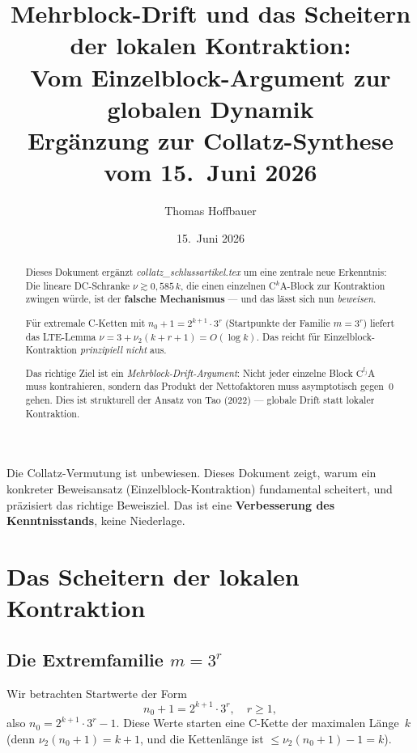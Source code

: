 \documentclass[12pt,a4paper]{article}
\title{%
  Mehrblock-Drift und das Scheitern der lokalen Kontraktion:\\[0.3em]
  Vom Einzelblock-Argument zur globalen Dynamik\\[0.5em]
  \large Ergänzung zur Collatz-Synthese vom 15.\ Juni 2026%
}
\author{Thomas Hoffbauer}
\date{15.\ Juni 2026}
\newcommand{\vii}{\nu_2}
\begin{document}
\maketitle

\begin{abstract}
Dieses Dokument ergänzt \textit{collatz\_schlussartikel.tex} um eine zentrale
neue Erkenntnis: Die lineare DC-Schranke $\nu \gtrsim 0{,}585\,k$, die einen
einzelnen C$^k$A-Block zur Kontraktion zwingen würde, ist der
\textbf{falsche Mechanismus} --- und das lässt sich nun \emph{beweisen}.

Für extremale C-Ketten mit $n_0+1 = 2^{k+1}\cdot 3^r$ (Startpunkte der
Familie $m = 3^r$) liefert das LTE-Lemma $\nu = 3 + \vii(k+r+1) = O(\log k)$.
Das reicht für Einzelblock-Kontraktion \emph{prinzipiell nicht} aus.

Das richtige Ziel ist ein \emph{Mehrblock-Drift-Argument}: Nicht jeder
einzelne Block $\mathrm{C}^{l_j}\mathrm{A}$ muss kontrahieren, sondern das
Produkt der Nettofaktoren muss asymptotisch gegen~$0$ gehen. Dies ist
strukturell der Ansatz von Tao (2022) --- globale Drift statt lokaler
Kontraktion.
\end{abstract}

\tableofcontents

\bigskip
\begin{tcolorbox}[warnung, title={Einordnung}]
Die Collatz-Vermutung ist unbewiesen. Dieses Dokument zeigt, warum ein
konkreter Beweisansatz (Einzelblock-Kontraktion) fundamental scheitert,
und präzisiert das richtige Beweisziel. Das ist eine \textbf{Verbesserung
des Kenntnisstands}, keine Niederlage.
\end{tcolorbox}

\section{Das Scheitern der lokalen Kontraktion}
\label{sec:scheitern}

\subsection{Die Extremfamilie $m = 3^r$}

Wir betrachten Startwerte der Form
\[
  n_0 + 1 = 2^{k+1} \cdot 3^r, \quad r \geq 1,
\]
also $n_0 = 2^{k+1}\cdot 3^r - 1$. Diese Werte starten eine C-Kette der
maximalen Länge~$k$ (denn $\vii(n_0+1) = k+1$, und die Kettenlänge ist
$\leq \vii(n_0+1) - 1 = k$).
\end{document}
